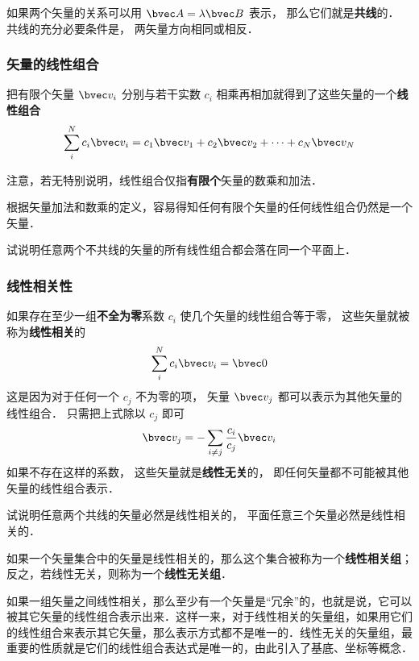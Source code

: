 如果两个矢量的关系可以用 $\bvec A = \lambda\bvec B$ 表示， 那么它们就是\textbf{共线}的． 共线的充分必要条件是， 两矢量方向相同或相反．

\subsubsection{矢量的线性组合}
把有限个矢量 $\bvec v_i$ 分别与若干实数 $c_i$ 相乘再相加就得到了这些矢量的一个\textbf{线性组合}
\begin{equation}\label{GVec_eq1}
\sum_i^N c_i \bvec v_i = c_1\bvec v_1 + c_2\bvec v_2 +\dots +c_N \bvec v_N
\end{equation}

注意，若无特别说明，线性组合仅指\textbf{有限个}矢量的数乘和加法．

根据矢量加法和数乘的定义，容易得知任何有限个矢量的任何线性组合仍然是一个矢量．

\begin{exercise}{}
试说明任意两个不共线的矢量的所有线性组合都会落在同一个平面上．
\end{exercise}

\subsubsection{线性相关性}

如果存在至少一组\textbf{不全为零}系数 $c_i$ 使几个矢量的线性组合等于零， 这些矢量就被称为\textbf{线性相关}的
\begin{equation}\label{GVec_eq2}
\sum_i^N c_i \bvec v_i = \bvec 0
\end{equation}
这是因为对于任何一个 $c_j$ 不为零的项， 矢量 $\bvec v_j$ 都可以表示为其他矢量的线性组合． 只需把上式除以 $c_j$ 即可
\begin{equation}\label{GVec_eq3}
\bvec v_j = -\sum_{i \ne j}\frac{c_i}{c_j} \bvec v_i
\end{equation}
如果不存在这样的系数， 这些矢量就是\textbf{线性无关}的， 即任何矢量都不可能被其他矢量的线性组合表示． 

\begin{exercise}{}
试说明任意两个共线的矢量必然是线性相关的， 平面任意三个矢量必然是线性相关的．
\end{exercise}

如果一个矢量集合中的矢量是线性相关的，那么这个集合被称为一个\textbf{线性相关组}；反之，若线性无关，则称为一个\textbf{线性无关组}．

如果一组矢量之间线性相关，那么至少有一个矢量是“冗余”的，也就是说，它可以被其它矢量的线性组合表示出来．这样一来，对于线性相关的矢量组，如果用它们的线性组合来表示其它矢量，那么表示方式都不是唯一的．线性无关的矢量组，最重要的性质就是它们的线性组合表达式是唯一的，由此引入了基底、坐标等概念．

